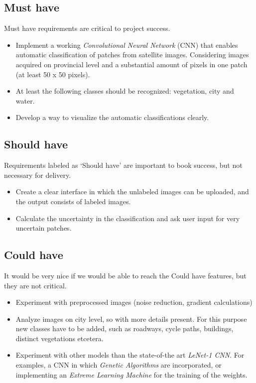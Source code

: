 \documentclass[a4paper,onecolumn]{report}
\begin{document}
\subsection{Must have}
Must have requirements are critical to project success. 
\begin{itemize}
\item Implement a working \textit{Convolutional Neural Network} (CNN) that enables automatic classification of patches from satellite images. Considering images acquired on provincial level and a substantial amount of pixels in one patch (at least 50 x 50 pixels). 
\item At least the following classes should be recognized: vegetation, city and water. 
\item Develop a way to visualize the automatic classifications clearly.
\end{itemize}

\subsection{Should have}
Requirements labeled as `Should have' are important to book success, but not necessary for delivery.

\begin{itemize}
\item Create a clear interface in which the unlabeled images can be uploaded, and the output consists of labeled images. 
\item Calculate the uncertainty in the classification and ask user input for very uncertain patches.
\end{itemize}

\subsection{Could have}
It would be very nice if we would be able to reach the Could have features, but they are not critical. 
\begin{itemize}
\item Experiment with preprocessed images (noise reduction, gradient calculations)
\item Analyze images on city level, so with more details present. For this purpose new classes have to be added, such as roadways, cycle paths, 	buildings, distinct vegetations etcetera. 
\item Experiment with other models than the state-of-the art \textit{LeNet-1 CNN}. For examples, a CNN in which \textit{Genetic Algorithms} are incorporated, or implementing an \textit{Extreme Learning Machine} for the training of the weights. 
\end{itemize}
\end{document}
